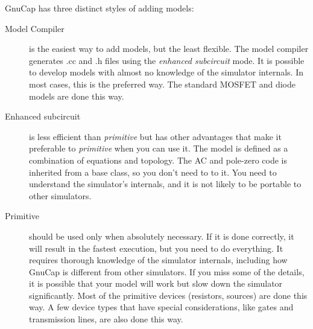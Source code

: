 %
%
%
%
GnuCap has three distinct styles of adding models:

\begin{description}
\item[Model Compiler] is the easiest way to add models, but the least
  flexible.  The model compiler generates .cc and .h files using the
  {\em enhanced subcircuit} mode.  It is possible to develop models
  with almost no knowledge of the simulator internals.  In most cases,
  this is the preferred way.  The standard MOSFET and diode models are
  done this way.
\item[Enhanced subcircuit] is less efficient than {\em primitive} but
  has other advantages that make it preferable to {\em primitive} when
  you can use it.  The model is defined as a combination of equations
  and topology.  The AC and pole-zero code is inherited from a base
  class, so you don't need to to it.  You need to understand the
  simulator's internals, and it is not likely to be portable to other
  simulators.
\item[Primitive] should be used only when absolutely necessary.  If it
  is done correctly, it will result in the fastest execution, but you
  need to do everything.  It requires thorough knowledge of the
  simulator internals, including how GnuCap is different from other
  simulators.  If you miss some of the details, it is possible that
  your model will work but slow down the simulator significantly.
  Most of the primitive devices (resistors, sources) are done this
  way.  A few device types that have special considerations, like
  gates and transmission lines, are also done this way.
\end{description}
